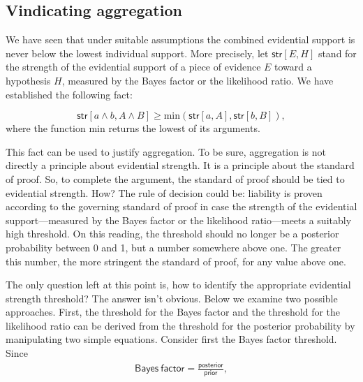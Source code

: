 \documentclass[
  10pt,
  dvipsnames,enabledeprecatedfontcommands]{scrartcl}
\begin{document}
\hypertarget{vindicating-aggregation}{%
\subsection{Vindicating aggregation}\label{vindicating-aggregation}}

We have seen that under suitable assumptions the combined evidential
support is never below the lowest individual support. More precisely,
let \(\mathsf{str}[E, H]\) stand for the strength of the evidential
support of a piece of evidence \(E\) toward a hypothesis \(H\), measured
by the Bayes factor or the likelihood ratio. We have established the
following fact:

\[\mathsf{str}[a \wedge b, A\wedge B] \geq \text{min}(\mathsf{str}[a, A], \mathsf{str}[b, B]),\]
where the function \(\text{min}\) returns the lowest of its arguments.

This fact can be used to justify aggregation. To be sure, aggregation is
not directly a principle about evidential strength. It is a principle
about the standard of proof. So, to complete the argument, the standard
of proof should be tied to evidential strength. How? The rule of
decision could be: liability is proven according to the governing
standard of proof in case the strength of the evidential
support---measured by the Bayes factor or the likelihood ratio---meets a
suitably high threshold. On this reading, the threshold should no longer
be a posterior probability between 0 and 1, but a number somewhere above
one. The greater this number, the more stringent the standard of proof,
for any value above one.

The only question left at this point is, how to identify the appropriate
evidential strength threshold? The answer isn't obvious. Below we
examine two possible approaches. First, the threshold for the Bayes
factor and the threshold for the likelihood ratio can be derived from
the threshold for the posterior probability by manipulating two simple
equations. Consider first the Bayes factor threshold. Since
\begin{align*}
\mathsf{ Bayes \: factor }=\frac{\mathsf{posterior }}{\mathsf{ prior}},
\end{align*}
\end{document}
